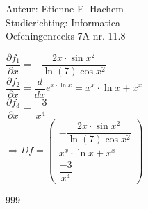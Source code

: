 \documentclass[a4paper]{article}
\begin{document}
  
\noindent \large Auteur: Etienne El Hachem \\
\noindent \large Studierichting: Informatica\\
\noindent \large Oefeningenreeks 7A nr. 11.8 \\

\medskip

\normalsize

$ \dfrac{\partial f_1}{\partial x}  = -\dfrac{2x\cdot\sin x^2}{\ln(7)\cos x^2} $\\

$ \dfrac{\partial f_2}{\partial x} = \dfrac{d}{dx}e^{x\cdot \ln x} = x^x \cdot \ln x + x^x $\\

$ \dfrac{\partial f_3}{\partial x} = \dfrac{-3}{x^4} $\\

$ \Rightarrow Df = 
\left(
  \begin{array}{c}
 -\dfrac{2x\cdot\sin x^2}{\ln(7)\cos x^2} \\

 x^x \cdot \ln x + x^x \\

 \dfrac{-3}{x^4}
 \end{array}
\right) $\\

\begin{thebibliography}{999}
\end{thebibliography}
\end{document}

